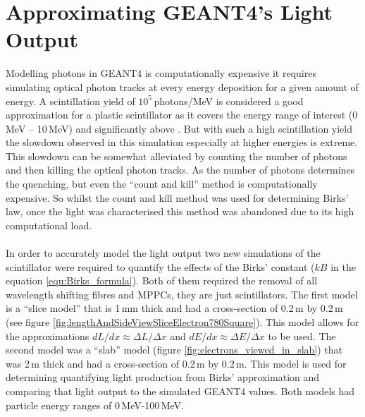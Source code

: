 \section{Approximating GEANT4's Light Output}\label{sec:GEANT4Simulation_MonteCarloBirksLaw}
Modelling photons in GEANT4 is computationally expensive it requires simulating optical photon tracks at every energy deposition for a given amount of energy. A scintillation yield of $10^5$\,photons/MeV is considered a good approximation for a plastic scintillator as it covers the energy range of interest (0\,MeV -- 10\,MeV) and significantly above \cite{craun_1970}. But with such a high scintillation yield the slowdown observed in this simulation especially at higher energies is extreme. This slowdown can be somewhat alleviated by counting the number of photons and then killing the optical photon tracks. As the number of photons determines the quenching, but even the ``count and kill'' method is computationally expensive. So whilst the count and kill method was used for determining Birks' law, once the light was characterised this method was abandoned due to its high computational load.
\\\\In order to accurately model the light output two new simulations of the scintillator were required to quantify the effects of the Birks' constant ($kB$ in the equation \ref{equ:Birks_formula}). Both of them required the removal of all wavelength shifting fibres and MPPCs, they are just scintillators. The first model is a ``slice model'' that is 1\,mm thick and had a cross-section of 0.2\,m by 0.2\,m (see figure \ref{fig:lengthAndSideViewSliceElectron780Square}). This model allows for the approximations $dL/dx \approx \Delta L / \Delta x$ and $dE/dx \approx \Delta E / \Delta x$ to be used. The second model was a ``slab'' model (figure \ref{fig:electrons_viewed_in_slab}) that was 2\,m thick and had a cross-section of 0.2\,m by 0.2\,m. This model is used for determining quantifying light production from Birks' approximation and comparing that light output to the simulated GEANT4 values. Both models had particle energy ranges of 0\,MeV-100\,MeV.

